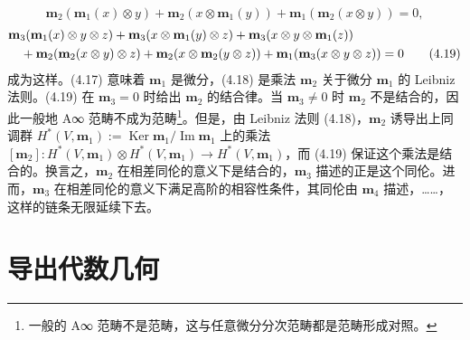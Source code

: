 \begin{equation}
  \mathbf{m}_2(\mathbf{m}_1(x)\otimes y) + \mathbf{m}_2(x\otimes\mathbf{m}_1(y)) + \mathbf{m}_1(\mathbf{m}_2(x\otimes y)) = 0, \tag{4.18}
\end{equation}
\begin{align}
  & \mathbf{m}_3(\mathbf{m}_1(x)\otimes y\otimes z) + \mathbf{m}_3(x\otimes\mathbf{m}_1(y)\otimes z)
    + \mathbf{m}_3(x\otimes y\otimes\mathbf{m}_1(z)) \notag\\
  & \quad + \mathbf{m}_2(\mathbf{m}_2(x\otimes y)\otimes z) + \mathbf{m}_2(x\otimes\mathbf{m}_2(y\otimes z))
    + \mathbf{m}_1(\mathbf{m}_3(x\otimes y\otimes z)) = 0 \tag{4.19}
\end{align}
成为这样。(4.17) 意味着 $\mathbf{m}_1$ 是微分，(4.18) 是乘法 $\mathbf{m}_2$ 关于微分 $\mathbf{m}_1$ 的 Leibniz 法则。(4.19) 在 $\mathbf{m}_3=0$ 时给出 $\mathbf{m}_2$ 的结合律。当 $\mathbf{m}_3\neq 0$ 时 $\mathbf{m}_2$ 不是结合的，因此一般地 A∞ 范畴不成为范畴\footnote{一般的 A∞ 范畴不是范畴，这与任意微分分次范畴都是范畴形成对照。}。但是，由 Leibniz 法则 (4.18)，$\mathbf{m}_2$ 诱导出上同调群 $H^{*}(V,\mathbf{m}_1):=\operatorname{Ker}\mathbf{m}_1/\operatorname{Im}\mathbf{m}_1$ 上的乘法 $[\mathbf{m}_2]\colon H^{*}(V,\mathbf{m}_1)\otimes H^{*}(V,\mathbf{m}_1)\to H^{*}(V,\mathbf{m}_1)$，而 (4.19) 保证这个乘法是结合的。换言之，$\mathbf{m}_2$ 在相差同伦的意义下是结合的，$\mathbf{m}_3$ 描述的正是这个同伦。进而，$\mathbf{m}_3$ 在相差同伦的意义下满足高阶的相容性条件，其同伦由 $\mathbf{m}_4$ 描述，……，这样的链条无限延续下去。

\section{导出代数几何}

